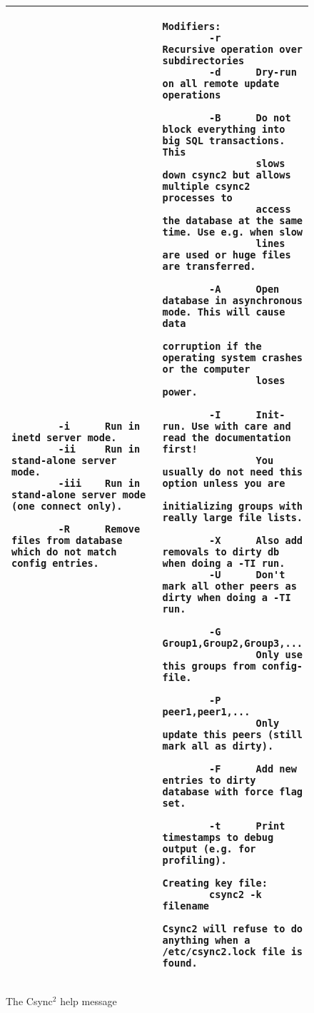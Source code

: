 \documentclass[a4paper,twocolumn]{article}
\def\csync2{{\sc Csync$^{2}$}}
\begin{document}
\begin{figure*}[t]
\begin{center}
\begin{tabular}{|p{0.5\linewidth}|p{0.5\linewidth}|}
\begin{tiny}
\begin{verbatim}
        -i      Run in inetd server mode.
        -ii     Run in stand-alone server mode.
        -iii    Run in stand-alone server mode (one connect only).

        -R      Remove files from database which do not match config entries.
\end{verbatim}
\end{tiny}

&

\begin{tiny}
\begin{verbatim}
Modifiers:
        -r      Recursive operation over subdirectories
        -d      Dry-run on all remote update operations

        -B      Do not block everything into big SQL transactions. This
                slows down csync2 but allows multiple csync2 processes to
                access the database at the same time. Use e.g. when slow
                lines are used or huge files are transferred.

        -A      Open database in asynchronous mode. This will cause data
                corruption if the operating system crashes or the computer
                loses power.

        -I      Init-run. Use with care and read the documentation first!
                You usually do not need this option unless you are
                initializing groups with really large file lists.

        -X      Also add removals to dirty db when doing a -TI run.
        -U      Don't mark all other peers as dirty when doing a -TI run.

        -G Group1,Group2,Group3,...
                Only use this groups from config-file.

        -P peer1,peer1,...
                Only update this peers (still mark all as dirty).

        -F      Add new entries to dirty database with force flag set.

        -t      Print timestamps to debug output (e.g. for profiling).

Creating key file:
        csync2 -k filename

Csync2 will refuse to do anything when a /etc/csync2.lock file is found.
\end{verbatim}
\end{tiny}
      \tabularnewline
      \hline
    \end{tabular}
  \end{center}
  \caption{The \csync2 help message}
\end{figure*}
\end{document}
